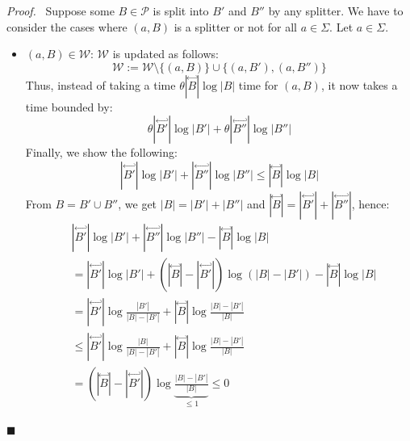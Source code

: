 \documentclass[12pt, a4 paper]{article}
\renewenvironment{proof}[1][Proof]{\begin{mdframed}[backgroundcolor=black!5, topline=false, rightline=false, bottomline=false, linecolor=black!15, linewidth=3pt]{\noindent\textit{#1.}\ }}{\noindent\par\hfill$\blacksquare$\end{mdframed}}
\theoremstyle{definition}
\begin{document}
\begin{proof}
    Suppose some $B \in \mathcal{P}$ is split into $B'$ and $B''$ by any splitter.
    We have to consider the cases where $(a , B)$ is a splitter or not for all $a \in \Sigma$.
    Let $a \in \Sigma$.
    \begin{itemize}
        \item $(a, B) \in \mathcal{W}$: $\mathcal{W}$ is updated as follows:
        $$ \mathcal{W} := \mathcal{W} \setminus \{(a, B)\} \cup \{(a, B'), (a, B'')\}$$
        Thus, instead of taking a time $\theta | \overset{\hookleftarrow}{B} | \log | B |$ time for $(a, B)$, it now takes a time bounded by:
        $$\theta | \overset{\hookleftarrow}{B'} | \log | B' | + \theta | \overset{\hookleftarrow}{B''} | \log | B'' |$$
        Finally, we show the following:
        \begin{equation*}
            | \overset{\hookleftarrow}{B'} | \log | B' | + | \overset{\hookleftarrow}{B''} | \log | B'' | \leq | \overset{\hookleftarrow}{B} | \log | B |
        \end{equation*}
        From $B = B' \cup B''$, we get $|B| = |B'| + |B''|$ and $| \overset{\hookleftarrow}{B} | = | \overset{\hookleftarrow}{B'} | + | \overset{\hookleftarrow}{B''} |$, hence:
        \begin{align*}
            & |\overset{\hookleftarrow}{B'} | \log | B' | + | \overset{\hookleftarrow}{B''} | \log | B'' | - | \overset{\hookleftarrow}{B} | \log | B | \\
            &= | \overset{\hookleftarrow}{B'} | \log | B' | + (| \overset{\hookleftarrow}{B} | - | \overset{\hookleftarrow}{B'}|) \log \left(|B|-|B'|\right) - | \overset{\hookleftarrow}{B} | \log | B | \\
            &= | \overset{\hookleftarrow}{B'} | \log \frac{|B'|}{|B|-|B'|} + | \overset{\hookleftarrow}{B} | \log \frac{|B|-|B'|}{|B|} \\
            &\leq | \overset{\hookleftarrow}{B'} | \log \frac{|B|}{|B|-|B'|} + | \overset{\hookleftarrow}{B} | \log \frac{|B|-|B'|}{|B|} \\
            &= (| \overset{\hookleftarrow}{B}| - |\overset{\hookleftarrow}{B'} |) \log \underset{\leq 1}{\underbrace{\frac{|B|-|B'|}{|B|}}} \leq 0
        \end{align*}


\end{itemize}
\end{proof}
\end{document}
